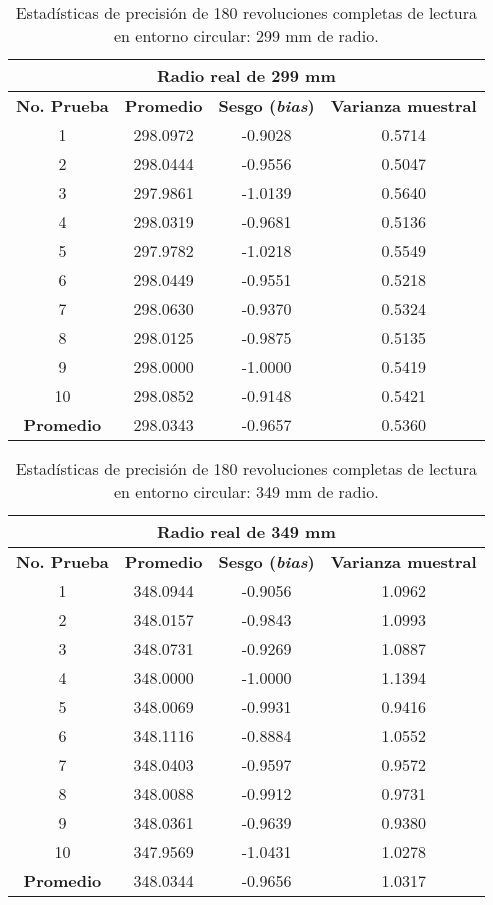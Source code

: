 \begin{table}[H]
	\centering
	\begin{tabular}{|c|c|c|c|}
		\hline
		\multicolumn{4}{|c|}{\textbf{Radio real de 299 mm}} \\ \hline
		\textbf{No. Prueba} & \textbf{Promedio} & \textbf{Sesgo (\textit{bias})} & \textbf{Varianza muestral} \\ \hline
		1 & 298.0972 & -0.9028 & 0.5714 \\ 
		2 & 298.0444 & -0.9556 & 0.5047 \\ 
		3 & 297.9861 & -1.0139 & 0.5640 \\ 
		4 & 298.0319 & -0.9681 & 0.5136 \\ 
		5 & 297.9782 & -1.0218 & 0.5549 \\ 
		6 & 298.0449 & -0.9551 & 0.5218 \\ 
		7 & 298.0630 & -0.9370 & 0.5324 \\ 
		8 & 298.0125 & -0.9875 & 0.5135 \\ 
		9 & 298.0000 & -1.0000 & 0.5419 \\ 
		10 & 298.0852 & -0.9148 & 0.5421 \\ \hline
		\textbf{Promedio} & 298.0343 & -0.9657 & 0.5360 \\ \hline
	\end{tabular}
	\caption{Estadísticas de precisión de 180 revoluciones completas de lectura en entorno circular: 299 mm de radio.}
	\label{fig:tabla_dists4}
\end{table}

\begin{table}[H]
	\centering
	\begin{tabular}{|c|c|c|c|}
		\hline
		\multicolumn{4}{|c|}{\textbf{Radio real de 349 mm}} \\ \hline
		\textbf{No. Prueba} & \textbf{Promedio} & \textbf{Sesgo (\textit{bias})} & \textbf{Varianza muestral} \\ \hline
		1 & 348.0944 & -0.9056 & 1.0962 \\ 
		2 & 348.0157 & -0.9843 & 1.0993 \\ 
		3 & 348.0731 & -0.9269 & 1.0887 \\ 
		4 & 348.0000 & -1.0000 & 1.1394 \\ 
		5 & 348.0069 & -0.9931 & 0.9416 \\ 
		6 & 348.1116 & -0.8884 & 1.0552 \\ 
		7 & 348.0403 & -0.9597 & 0.9572 \\ 
		8 & 348.0088 & -0.9912 & 0.9731 \\ 
		9 & 348.0361 & -0.9639 & 0.9380 \\ 
		10 & 347.9569 & -1.0431 & 1.0278 \\ \hline
		\textbf{Promedio} & 348.0344 & -0.9656 & 1.0317 \\ \hline
	\end{tabular}
	\caption{Estadísticas de precisión de 180 revoluciones completas de lectura en entorno circular: 349 mm de radio.}
	\label{fig:tabla_dists5}
\end{table}

